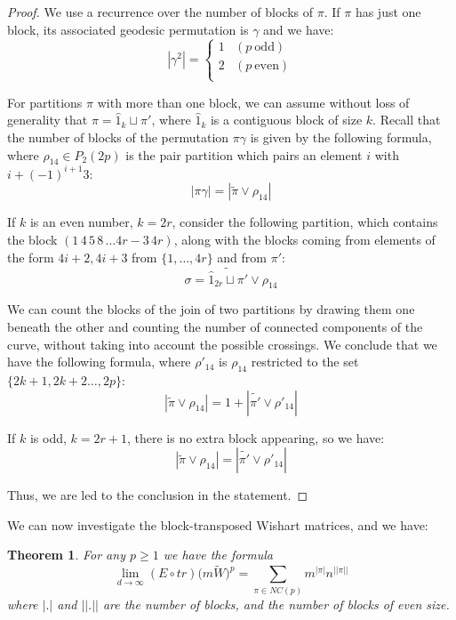 \documentclass[12pt]{amsbook}
\newtheorem{theorem}{Theorem}[chapter]
\begin{document}
\begin{proof}
We use a recurrence over the number of blocks of $\pi$. If $\pi$ has just one block, its associated geodesic permutation is $\gamma$ and we have:
$$|\gamma^2|=\begin{cases}
1&(p\ \text{odd})\\ 
2&(p\ \text{even})\\
\end{cases}$$

For partitions $\pi$ with more than one block, we can assume without loss of generality that $\pi = \hat 1_k \sqcup \pi'$, where $\hat 1_k$ is a contiguous block of size $k$. Recall that the number of blocks of the permutation $\pi\gamma$ is given by the following formula, where $\rho_{14} \in P_2(2p)$ is the pair partition which pairs an element $i$ with $i+(-1)^{i+1}3$:
$$|\pi\gamma|=|\widetilde{\pi}\vee\rho_{14}|$$

If $k$ is an even number, $k=2r$, consider the following partition, which contains the block $(1 \, 4 \, 5 \, 8 \, \ldots 4r-3 \, 4r)$, along with the blocks coming from elements of the form $4i+2, 4i+3$ from $\{1, \ldots, 4r\}$ and from $\pi'$:
$$\sigma=\widetilde{\hat 1_{2r} \sqcup \pi'}\vee \rho_{14}$$

We can count the blocks of the join of two partitions by drawing them one beneath the other and counting the number of connected components of the curve, without taking into account the possible crossings. We conclude that we have the following formula, where $\rho'_{14}$ is $\rho_{14}$ restricted to the set $\{2k+1, 2k+2 \ldots, 2p\}$:
$$|\widetilde{\pi}\vee\rho_{14}|=1+|\widetilde{\pi'}\vee\rho'_{14}|$$

If $k$ is odd, $k=2r+1$, there is no extra block appearing, so we have:
$$|\widetilde{\pi}\vee\rho_{14}|=|\widetilde{\pi'}\vee\rho'_{14}|$$

Thus, we are led to the conclusion in the statement.
\end{proof}

We can now investigate the block-transposed Wishart matrices, and we have:

\begin{theorem}
For any $p\geq 1$ we have the formula
$$\lim_{d\to\infty}(E\circ tr)\big(m\tilde{W}\big)^p
=\sum_{\pi\in NC(p)}m^{|\pi|}n^{||\pi||}$$
where $|.|$ and $||.||$ are the number of blocks, and the number of blocks of even size. 
\end{theorem}
\end{document}
